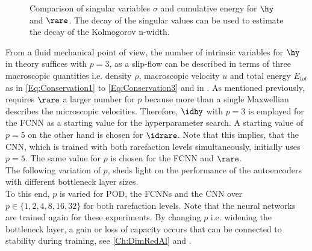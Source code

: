 \begin{figure}[H]
	\begin{subfigure}{.45\textwidth}
		
		\label{Fig:CumSum_Rare}
	\end{subfigure}\hfill
	\begin{subfigure}{.45\textwidth}
		
		\label{Fig:CumSum_Hydro}
	\end{subfigure}
	\caption{Comparison of singular variables \(\sigma\) and cumulative energy for \(\hy\) and \(\rare\). The decay of the singular values can be used to estimate the decay of the Kolmogorov n-width.}
	\label{Fig:CUSUM-e}
\end{figure}
From a fluid mechanical point of view, the number of intrinsic variables for \(\hy\) in theory suffices with \(p=3\), as a slip-flow can be described in terms of three macroscopic quantities i.e. density \(\rho\), macroscopic velocity \(u\) and total energy \(E_{tot}\) as in \cref{Eq:Conservation1} to \cref{Eq:Conservation3} and in \cite{BGK}\cite{Bernard}. As mentioned previously, requires \(\rare\) a larger number for \(p\) because more than a single Maxwellian describes the microscopic velocities. Therefore, \(\idhy\) with \(p=3\) is employed for the FCNN as a starting value for the hyperparameter search. A starting value of \(p=5\) on the other hand is chosen for \(\idrare\). Note that this implies, that the CNN, which is trained with both rarefaction levels simultaneously, initially uses \(p=5\). The same value for \(p\) is chosen for the FCNN and \(\rare\).\\
The following variation of \(p\), sheds light on the performance of the autoencoders with different bottleneck layer sizes.\\
To this end, $p$ is varied for POD, the FCNNs and the CNN over $p \in \{1,2,4,8,16,32\}$ for both rarefaction levels. Note that the neural networks are trained again for these experiments. By changing $p$ i.e. widening the bottleneck layer, a gain or loss of capacity occurs that can be connected to stability during training, see \cref{Ch:DimRedAl} and \cite{Goodfellow}.
